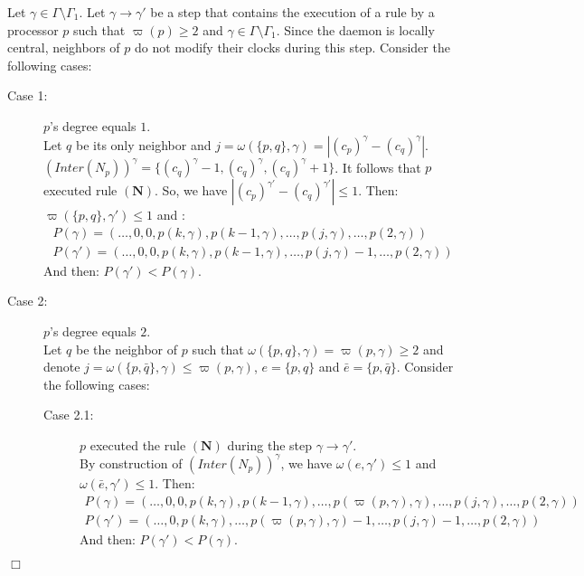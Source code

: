 \documentclass[11pt,english,letterpaper]{article}
\newenvironment{proof}{{\noindent\bf Proof. } }{{\hfill $\Box$}}
\begin{document}
\begin{proof}
Let $\gamma\in\Gamma\setminus\Gamma_{1}$. Let $\gamma\rightarrow\gamma'$ be a step that contains the execution of a rule by a processor $p$ such that $\varpi(p)\geq 2$ and $\gamma\in\Gamma\setminus\Gamma_{1}$. Since the daemon is locally central, neighbors of $p$ do not modify their clocks during this step. Consider the following cases:

\begin{description}
\item[Case 1:] $p$'s degree equals $1$.\\
Let $q$ be its only neighbor and $j=\omega(\{p,q\},\gamma)=|\left(c_{p}\right)^{\gamma}-\left(c_{q}\right)^{\gamma}|$. $\left(Inter(N_{p})\right)^{\gamma}=\{\left(c_{q}\right)^{\gamma}-1,\left(c_{q}\right)^{\gamma},\left(c_{q}\right)^{\gamma}+1\}$. It follows that $p$ executed rule $\boldsymbol{(N)}$. So, we have $|\left(c_{p}\right)^{\gamma'}-\left(c_{q}\right)^{\gamma'}|\leq 1$. Then: $\varpi(\{p,q\},\gamma')\leq 1$ and :
\[\begin{array}{c}P(\gamma)=\left(\ldots,0,0,p(k,\gamma),p(k-1,\gamma),\ldots,p(j,\gamma),\ldots,p(2,\gamma)\right)\\
P(\gamma')=\left(\ldots,0,0,p(k,\gamma),p(k-1,\gamma),\ldots,p(j,\gamma)-1,\ldots,p(2,\gamma)\right)\end{array}\]
And then: $P(\gamma')<P(\gamma)$.

\item[Case 2:] $p$'s degree equals $2$.\\
Let $q$ be the neighbor of $p$ such that $\omega(\{p,q\},\gamma)=\varpi(p,\gamma) \geq 2$ and denote $j=\omega(\{p,\bar{q}\},\gamma)\leq \varpi(p,\gamma)$, $e=\{p,q\}$ and $\bar{e}=\{p,\bar{q}\}$. Consider the following cases:

\begin{description}
\item[Case 2.1:] $p$ executed the rule $\boldsymbol{(N)}$ during the step $\gamma\rightarrow\gamma'$.\\
By construction of $\left(Inter(N_{p})\right)^{\gamma}$, we have $\omega(e,\gamma')\leq 1$ and $\omega(\bar{e},\gamma')\leq 1$. Then:
\[\begin{array}{c}P(\gamma)=\left(\ldots,0,0,p(k,\gamma),p(k-1,\gamma),\ldots,p(\varpi(p,\gamma),\gamma),\ldots,p(j,\gamma),\ldots,p(2,\gamma)\right)\\
P(\gamma')=\left(\ldots,0,p(k,\gamma),\ldots,p(\varpi(p,\gamma),\gamma)-1,\ldots,p(j,\gamma)-1,\ldots,p(2,\gamma)\right)\end{array}\]
And then: $P(\gamma')<P(\gamma)$.


\end{description}
\end{description}
\end{proof}
\end{document}
